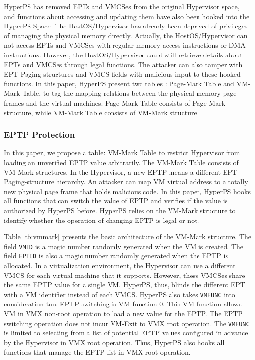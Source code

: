 HyperPS has removed EPTs and VMCSes from the original Hypervisor space, and functions about accessing and updating them have also been hooked into the HyperPS Space. 
The HostOS/Hypervisor has already been deprived of privileges of managing the physical memory directly. Actually, the HostOS/Hypervisor can not access EPTs and VMCSes with regular memory access instructions or DMA instructions. 
However, the HostOS/Hypervisor could still retrieve details about EPTs and VMCSes through legal functions. 
The attacker can also tamper with EPT Paging-structures and VMCS fields with malicious input to these hooked functions.
In this paper, HyperPS present two tables : Page-Mark Table and VM-Mark Table, to tag the mapping relations between the physical memory page frames and the virtual machines. Page-Mark Table consists of Page-Mark structure, while VM-Mark Table consists of VM-Mark structure.

\subsubsection{EPTP Protection}%
\label{ssub:eptp_protection}
In this paper, we propose a table: VM-Mark Table to restrict Hypervisor from loading an unverified EPTP value arbitrarily.
The VM-Mark Table consists of VM-Mark structures. 
In the Hypervisor, a new EPTP means a different EPT Paging-structure hierarchy. An attacker can map VM virtual address to a totally new physical page frame that holds malicious code. In this paper, HyperPS hooks all functions that can switch the value of EPTP and verifies if the value is authorized by HyperPS before. HyperPS relies on the VM-Mark structure to identify whether the operation of changing EPTP is legal or not. 

Table \ref{tb:vmmark} presents the basic architecture of the VM-Mark structure.
The field \verb|VMID| is a magic number randomly generated when the VM is created. 
The field \verb|EPTID| is also a magic number randomly generated when the EPTP is allocated.
In a virtualization environment,
the Hypervisor can use a different VMCS for each virtual machine that it supports. However, these VMCSes share the same EPTP value for a single VM. 
HyperPS, thus, blinds the different EPT with a VM identifier instead of each VMCS.
HyperPS also takes \verb|VMFUNC| into consideration too. EPTP switching is VM function 0. This VM function allows VM in VMX non-root operation to load a new value for the EPTP. The EPTP switching operation does not incur VM-Exit to VMX root operation.
The \verb|VMFUNC| is limited to selecting from a list of potential EPTP values configured in advance by the Hypervisor in VMX root operation. Thus, HyperPS also hooks all functions that manage the EPTP list in VMX root operation.

